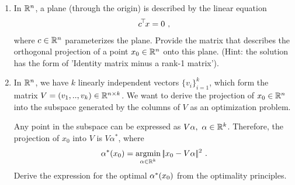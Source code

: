 \begin{enumerate}

  \item In ${\mathbb{R}}^n$, a plane (through the origin) is described by
the linear equation
\begin{align}
  c^{\!\top\!} x = 0 ~,
\end{align}
where $c\in{\mathbb{R}}^n$ parameterizes the plane. Provide the matrix that describes the orthogonal projection of a point $x_0 \in {\mathbb{R}}^n$ onto this plane. (Hint: the solution has the form of 'Identity matrix minus a rank-1 matrix').


\item In ${\mathbb{R}}^n$, we have $k$ linearly independent vectors $\{v_i\}_{i=1}^k$, which form the matrix $V = (v_1,..,v_k) \in{\mathbb{R}}^{n\times k}$. 
We want to derive the projection of $x_0 \in {\mathbb{R}}^n$ into the subspace generated by the columns of $V$ as an optimization problem.

Any point in the subspace can be expressed as $V \alpha, ~\alpha \in {\mathbb{R}}^k$. Therefore, the projection of $x_0$ into $V$ is $V \alpha^*$, where
\begin{equation}
  \alpha^*(x_0) = \operatorname*{argmin}_{\alpha\in{\mathbb{R}}^k} |\!|x_0 - V \alpha|\!|^2 ~.
\end{equation}
Derive the expression for the optimal $\alpha^*(x_0)$ from the optimality principles.



\end{enumerate}


\exerfoot
